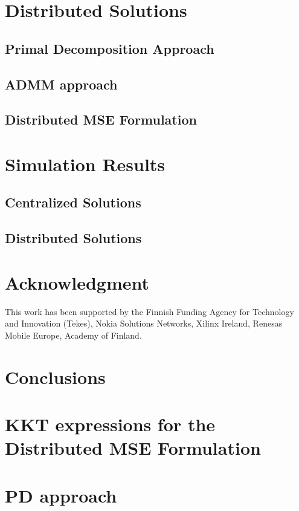 \documentclass[10pt,letterpaper,journal,onecolumn]{./../Styles/IEEEtran}
\begin{document}
\section{Distributed Solutions} \label{sec-4}



\subsection{Primal Decomposition Approach} \label{sec-4.1}


%

\subsection{\ac{ADMM} approach} \label{sec-4.2}


%

\subsection{Distributed MSE Formulation} \label{sec-4.3}



\section{Simulation Results} \label{sec-5}
\subsection{Centralized Solutions}


\subsection{Distributed Solutions}


\section*{Acknowledgment}
This work has been supported by the Finnish Funding Agency for Technology and Innovation (Tekes), Nokia Solutions Networks, Xilinx Ireland, Renesas Mobile Europe, Academy of Finland.

\section{Conclusions}

\appendices

\section{\ac{KKT} expressions for the Distributed MSE Formulation} \label{a-1}


\section{\acl{PD} approach} \label{a-2}




\end{document}
